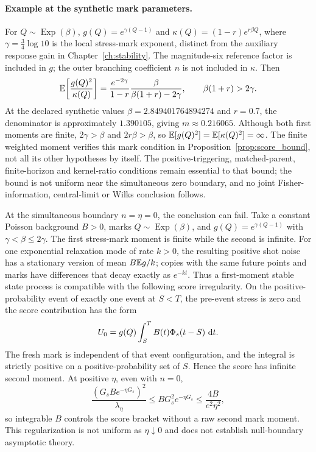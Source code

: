 \paragraph{Example at the synthetic mark parameters.}
For \(Q\sim\operatorname{Exp}(\beta)\),
\(g(Q)=e^{\gamma(Q-1)}\) and \(\kappa(Q)=(1-r)e^{r\beta Q}\),
where \(\gamma=\tfrac34\log 10\) is the local stress-mark exponent,
distinct from the auxiliary response gain in Chapter~\ref{ch:stability}.
The magnitude-six reference factor is included in \(g\); the outer
branching coefficient \(n\) is not included in \(\kappa\). Then
\[
  \mathbb{E}\!\left[\frac{g(Q)^2}{\kappa(Q)}\right]
  =\frac{e^{-2\gamma}}{1-r}
    \frac{\beta}{\beta(1+r)-2\gamma},
  \qquad \beta(1+r)>2\gamma.
\]
At the declared synthetic values \(\beta=2.849401764894274\) and \(r=0.7\),
the denominator is approximately \(1.390105\), giving
\(m\approx0.216065\). Although both first moments are finite,
\(2\gamma>\beta\) and \(2r\beta>\beta\), so
\(\mathbb{E}[g(Q)^2]=\mathbb{E}[\kappa(Q)^2]=\infty\).
The finite weighted moment verifies this mark condition in Proposition~\ref{prop:score_bound},
not all its other hypotheses by itself. The positive-triggering,
matched-parent, finite-horizon and kernel-ratio conditions remain essential to that bound;
the bound is not uniform near the simultaneous zero boundary, and
no joint Fisher-information, central-limit or Wilks conclusion follows.

At the simultaneous boundary \(n=\eta=0\), the conclusion can fail. Take a constant Poisson background \(B>0\), marks \(Q\sim\operatorname{Exp}(\beta)\), and \(g(Q)=e^{\gamma(Q-1)}\) with \(\gamma<\beta\le2\gamma\). The first stress-mark moment is finite while the second is infinite. For one exponential relaxation mode of rate \(k>0\), the resulting positive shot noise has a stationary version of mean \(B\mathbb{E} g/k\); copies with the same future points and marks have differences that decay exactly as \(e^{-kt}\). Thus a first-moment stable state process is compatible with the following score irregularity. On the positive-probability event of exactly one event at \(S<T\), the pre-event stress is zero and the score contribution has the form
\[
U_0=g(Q)\int_S^T B(t)\Phi_s(t-S)\,\mathop{}\!\mathrm{d} t.
\]
The fresh mark is independent of that event configuration, and the integral is strictly positive on a positive-probability set of \(S\). Hence the score has infinite second moment. At positive \(\eta\), even with \(n=0\),
\[
\frac{(G_sB e^{-\eta G_s})^2}{\lambda_\eta}
\le B G_s^2e^{-\eta G_s}
\le\frac{4B}{e^2\eta^2},
\]
so integrable \(B\) controls the score bracket without a raw second mark moment. This regularization is not uniform as \(\eta\downarrow0\) and does not establish null-boundary asymptotic theory.

